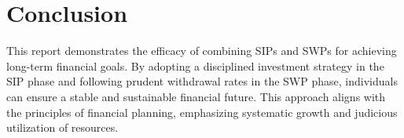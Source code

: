 \documentclass[a4paper,12pt]{article}
\newcommand{\urdusection}[1]{%
	\section*{\begin{center}\begin{urdu}\large\urdufont #1\end{urdu}\end{center}}%
}
\begin{document}
		\section{Conclusion}
		This report demonstrates the efficacy of combining SIPs and SWPs for achieving long-term financial goals. By adopting a disciplined investment strategy in the SIP phase and following prudent withdrawal rates in the SWP phase, individuals can ensure a stable and sustainable financial future. This approach aligns with the principles of financial planning, emphasizing systematic growth and judicious utilization of resources.
		
		\newpage
		
\end{document}
